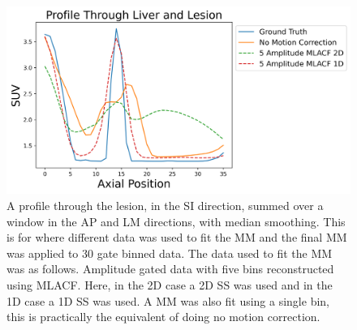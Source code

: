             \begin{figure}
                \centering
                
                \includegraphics[width=1.0\linewidth]{figures/motion_correction_2_results_2_1d_vs_2d_profile.png}
                
                \captionsetup{singlelinecheck=false}
                \caption{
                    A profile through the lesion, in the \gls{SI} direction, summed over a window in the \gls{AP} and \gls{LM} directions, with median smoothing. This is for where different data was used to fit the \gls{MM} and the final \gls{MM} was applied to $30$ gate binned data. The data used to fit the \gls{MM} was as follows. Amplitude gated data with five bins reconstructed using \gls{MLACF}. Here, in the \gls{2D} case a \gls{2D} \gls{SS} was used and in the \gls{1D} case a \gls{1D} \gls{SS} was used. A \gls{MM} was also fit using a single bin, this is practically the equivalent of doing no motion correction.
                }
                
                \label{fig:evaluation_of_pet_ct_motion_correction_incorporating_motion_models_using_mlacf_and_complex_gating_schemes_results_1d_vs_2d_profile}
            \end{figure}

